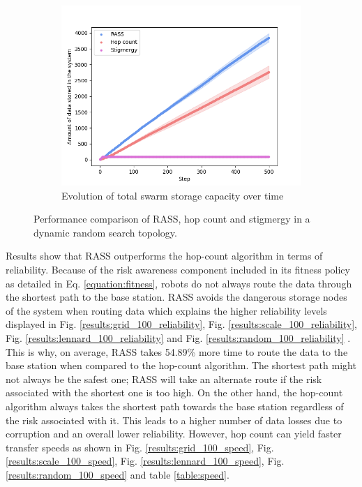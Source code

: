 \documentclass[letterpaper, 10 pt, conference]{ieeeconf}
\begin{document}
\begin{figure}
\begin{subfigure}{0.30\textwidth}
        \includegraphics[width=\textwidth]{figures/random_storage.png}
        \caption{Evolution of total swarm storage capacity over time}
        \label{results:random_100_storage}
    \end{subfigure}
    \caption{Performance comparison of RASS, hop count and stigmergy in a dynamic random search topology.}
    \label{results:dynamicTopologyRandom}
    \vspace{-2mm}
\end{figure}

Results show that RASS outperforms the hop-count algorithm in terms of reliability. Because 
of the risk awareness component included in its fitness policy as detailed in Eq. 
\ref{equation:fitness}, robots do not always route the data through the shortest path to 
the base station. RASS avoids the dangerous storage nodes of the system when routing data 
which explains the higher reliability levels displayed in Fig. 
\ref{results:grid_100_reliability}, Fig. \ref{results:scale_100_reliability}, Fig. 
\ref{results:lennard_100_reliability} and Fig. \ref{results:random_100_reliability} . This 
is why, on average, RASS takes 54.89\% more time to route the data to the base station when 
compared to the hop-count algorithm. The shortest path might not always be the safest one; 
RASS will take an alternate route if the risk associated with the shortest one is too high. 
On the other hand, the hop-count algorithm always takes the shortest path towards the base 
station regardless of the risk associated with it. This leads to a higher number of data 
losses due to corruption and an overall lower reliability.
However, hop count can yield faster transfer speeds as shown in Fig. \ref{results:grid_100_speed}, Fig. \ref{results:scale_100_speed}, Fig. \ref{results:lennard_100_speed}, Fig. \ref{results:random_100_speed} and table \ref{table:speed}.
\end{document}
